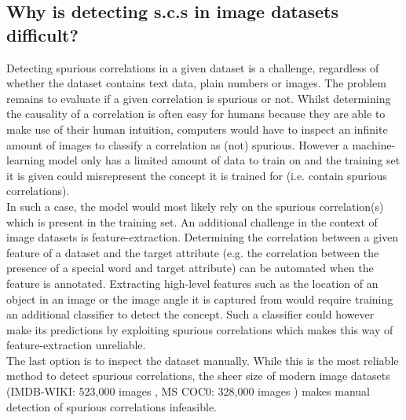 \documentclass{article}
\begin{document}
\subsection{Why is detecting s.c.s in image datasets difficult?}
\label{sec:challenges}
Detecting spurious correlations in a given dataset is a challenge, regardless of whether the dataset contains
text data, plain numbers or images. The problem remains to evaluate if a given correlation is spurious or not.
Whilst determining the causality of a correlation is often easy for humans because they are able to make use of
their human intuition, computers would have to inspect an infinite amount of images to classify a correlation as
(not) spurious. However a machine-learning model only has a limited amount of data to train on and the training
set it is given could misrepresent the concept it is trained for (i.e. contain spurious correlations). \\
In such a case, the model would most likely rely on the spurious correlation(s) which is present in the training set.
An additional challenge in the context of image datasets is feature-extraction. Determining the correlation
between a given feature of a dataset and the target attribute (e.g. the correlation between the presence of a special word
and target attribute) can be automated when the feature is annotated. Extracting high-level features such as
the location of an object in an image or the image angle it is captured from would require training
an additional classifier to detect the concept. Such a classifier could however make its predictions by exploiting spurious
correlations which makes this way of feature-extraction unreliable. \\
The last option is to inspect the dataset manually. While this is the most reliable method to detect spurious correlations,
the sheer size of modern image datasets (IMDB-WIKI: 523,000 images \cite{Rothe-ICCVW-2015}, MS COC0: 328,000 images 
\cite{lin2015microsoft}) makes manual detection of spurious correlations infeasible.
\end{document}
